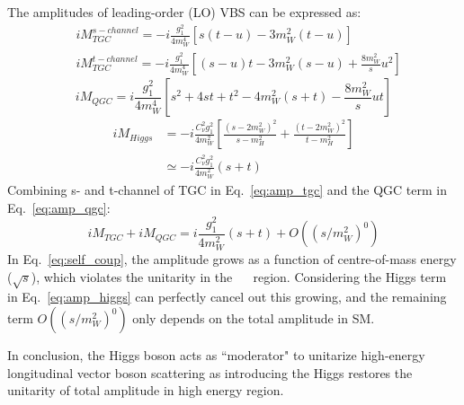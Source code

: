The amplitudes of leading-order (LO) VBS can be expressed as\cite{PhysRevD.87.093005}:
\begin{equation} \label{eq:amp_tgc}
\begin{split}
	& {iM}_{TGC}^{s-channel} = -i\frac{g_{1}^{2}}{4m_{W}^{4}}[s(t-u)-3m_{W}^{2}(t-u)] \\
	& {iM}_{TGC}^{t-channel} = -i\frac{g_{1}^{2}}{4m_{W}^{4}}\left[(s-u)t-3m_{W}^{2}(s-u)+\frac{8m_{W}^{2}}{s}u^{2}\right]
\end{split}
\end{equation}
\begin{equation} \label{eq:amp_qgc}
	{iM}_{QGC} = i\frac{g_{1}^{2}}{4m_{W}^{4}}\left[s^{2}+4st+t^{2}-4m_{W}^{2}(s+t)-\frac{8m_{W}^{2}}{s}ut\right]
\end{equation}
\begin{equation} \label{eq:amp_higgs}
\begin{split}
	{iM}_{Higgs} & = -i\frac{C_{\nu}^{2}g_{1}^{2}}{4m_{W}^{2}}\left[\frac{(s-2m_{W}^{2})^{2}}{s-m_{H}^{2}} + \frac{(t-2m_{W}^{2})^{2}}{t-m_{H}^{2}}\right] \\
                     & \simeq -i\frac{C_{\nu}^{2}g_{1}^{2}}{4m_{W}^{2}}(s+t)
\end{split}
\end{equation}
Combining s- and t-channel of TGC in Eq.~\ref{eq:amp_tgc} and the QGC term in Eq.~\ref{eq:amp_qgc}:
\begin{equation} \label{eq:self_coup}
	{iM}_{TGC} + {iM}_{QGC}= i\frac{g_{1}^{2}}{4m_{W}^{2}}(s+t) + {O}((s/m_{W}^{2})^{0})
\end{equation}
In Eq.~\ref{eq:self_coup}, the amplitude grows as a function of centre-of-mass energy ($\sqrt{s}$),
which violates the unitarity in the ~\tev~ region.
Considering the Higgs term in Eq.~\ref{eq:amp_higgs} can perfectly cancel out this growing,
and the remaining term ${O}((s/m_{W}^{2})^{0})$ only depends on the total amplitude in SM.

In conclusion, the Higgs boson acts as ``moderator" to unitarize high-energy longitudinal vector boson scattering
as introducing the Higgs restores the unitarity of total amplitude in high energy region.
